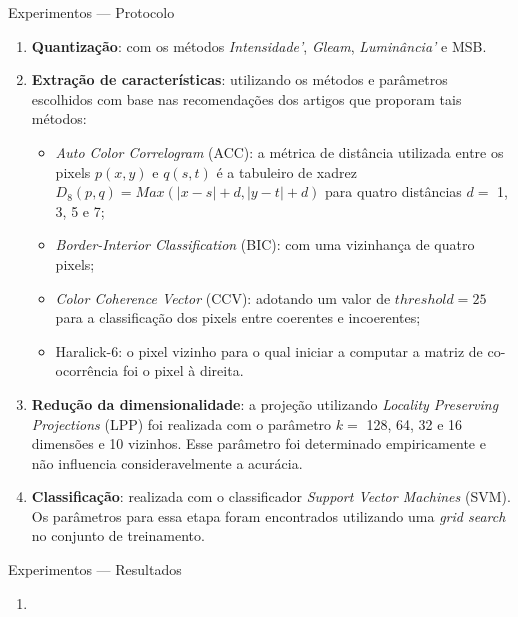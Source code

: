 \documentclass{beamer}
\begin{document}
\begin{frame}{Experimentos --- Protocolo}
\setlength\leftmargini{1em}
\begin{block}{}
\justifying
\begin{enumerate}
  \item \textbf{Quantização}: com os métodos \emph{Intensidade'}, \emph{Gleam}, \emph{Luminância'} e MSB.
  \item \textbf{Extração de características}: utilizando os métodos e parâmetros escolhidos com base nas recomendações dos artigos que proporam tais métodos:
  \begin{itemize}
    \item \textit{Auto Color Correlogram} (ACC): a métrica de distância utilizada entre os pixels $p(x,y)$ e $q(s,t)$ é a tabuleiro de xadrez $D_8(p,q) = Max(|x-s| + d, |y-t| + d)$ para quatro distâncias $d =$ 1, 3, 5 e 7;
    \item \textit{Border-Interior Classification} (BIC): com uma vizinhança de quatro pixels;
    \item \textit{Color Coherence Vector} (CCV): adotando um valor de $\mathit{threshold} = 25$ para a classificação dos pixels entre coerentes e incoerentes;
    \item Haralick-6: o pixel vizinho para o qual iniciar a computar a matriz de co-ocorrência foi o pixel à direita.
  \end{itemize}
  \item \textbf{Redução da dimensionalidade}: a projeção utilizando \textit{Locality Preserving Projections} (LPP) foi realizada com o parâmetro $k =$ 128, 64, 32 e 16 dimensões e 10 vizinhos. Esse parâmetro foi determinado empiricamente e não influencia consideravelmente a acurácia.
  \item \textbf{Classificação}: realizada com o classificador \textit{Support Vector Machines} (SVM). Os parâmetros para essa etapa foram encontrados utilizando uma \textit{grid search} no conjunto de treinamento.
\end{enumerate}
\end{block}
\end{frame}
\begin{frame}{Experimentos --- Resultados}
\setlength\leftmargini{1em}
\begin{block}{}
\justifying
\begin{enumerate}
\item
\end{enumerate}
\end{block}
\end{frame}
\end{document}
